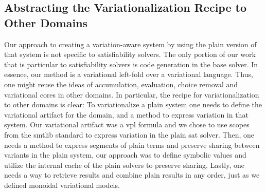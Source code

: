 \subsection{Abstracting the Variationalization Recipe to Other Domains}
Our approach to creating a variation-aware system by using the plain version of
that system is not specific to satisfiability solvers. The only portion of our
work that is particular to satisfiability solvers is code generation in the base
solver. In essence, our method is a variational left-fold over a variational
language. Thus, one might reuse the ideas of accumulation, evaluation, choice
removal and variational cores in other domains. In particular, the recipe for
variationalization to other domains is clear: To variationalize a plain system
one needs to define the variational artifact for the domain, and a method to
express variation in that system. Our variational artifact was a \ac{vpl}
formula and we chose to use scopes from the \acl{smtlib} standard to express
variation in the plain \ac{sat} solver. Then, one needs a method to express
segments of plain terms and preserve sharing between variants in the plain
system, our approach was to define symbolic values and utilize the internal
cache of the plain solvers to preserve sharing. Lastly, one needs a way to
retrieve results and combine plain results in any order, just as we defined
monoidal variational models.

